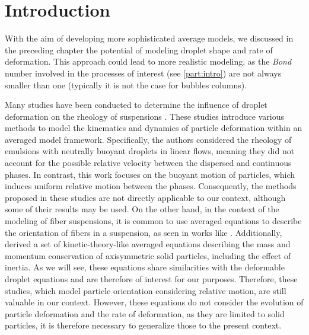 \section{Introduction}
\label{sec:intro_ellipse}
With the aim of developing more sophisticated average models, we discussed in the preceding chapter the potential of modeling droplet shape and rate of deformation. 
This approach could lead to more realistic modeling, as the \textit{Bond} number involved in the processes of interest (see \ref{part:intro}) are not always smaller than one (typically it is not the case for bubbles columns). 

Many studies have been conducted to determine the influence of droplet deformation on the rheology of suspensions 
\citep{goddard1967nonlinear,lhuillier1987phenomenology,rallison1984deformation,Cox1969deformation,stone1994dynamics,wu2002ellipsoidal,mwasame2017macroscopic}.
These studies introduce various methods to model the kinematics   and dynamics of particle deformation within an averaged model framework. 
Specifically, the authors considered the rheology of emulsions with neutrally buoyant droplets in linear flows, meaning they did not account for the possible relative velocity between the dispersed and continuous phases. 
In contrast, this work focuses on the buoyant motion of particles, which induces uniform relative motion between the phases. 
Consequently, the methods proposed in these studies are not directly applicable to our context, although some of their results may be used. 
On the other hand, in the context of the modeling of fiber suspensions, it is common to use averaged equations to describe the orientation of fibers in a suspension, as seen in works like \citet{wang2008objective}. 
Additionally, \citet{curtiss1956kinetic} derived a set of kinetic-theory-like averaged equations describing the mass and momentum conservation of axisymmetric solid particles, including the effect of inertia. 
As we will see, these equations share similarities with the deformable droplet equations and are therefore of interest for our purposes.
Therefore, these studies, which model particle orientation considering relative motion, are still valuable in our context. 
However, these equations do not consider the evolution of particle deformation and the rate of deformation, as they are limited to solid particles, it is therefore necessary to generalize those to the present context.  

